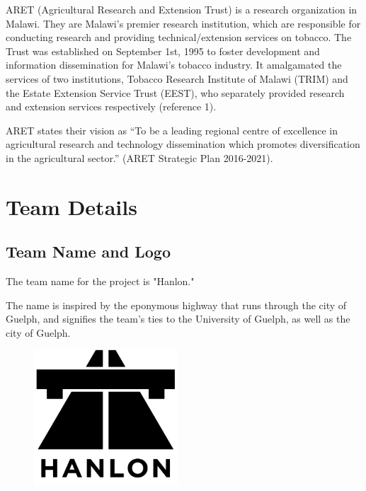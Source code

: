 \documentclass[12pt,letterpaper]{article}
\begin{document}
ARET (Agricultural Research and Extension Trust) is a research organization in Malawi. They are Malawi’s premier research institution, which are  responsible for conducting research and providing technical/extension services on tobacco. The Trust was established on September 1st, 1995 to foster development and information dissemination for Malawi’s tobacco industry. It amalgamated the services of two institutions, Tobacco Research Institute of Malawi (TRIM) and the Estate Extension Service Trust (EEST), who separately provided research and extension services respectively (reference 1). \par

ARET states their vision as “To be a leading regional centre of excellence in agricultural research and technology dissemination which promotes diversification in the agricultural sector.” (ARET Strategic Plan 2016-2021). 

\clearpage
\section{Team Details}
\subsection{Team Name and Logo}
The team name for the project is "Hanlon."\par
The name is inspired by the eponymous highway that runs through the city of Guelph, and signifies the team's ties to the University of Guelph, as well as the city of Guelph.\\

\begin{figure}[H]
	\centering	
	\includegraphics[height=2in]{img/hanlon-logo.png}
	\label{fig:kitten}
\end{figure}
\end{document}
